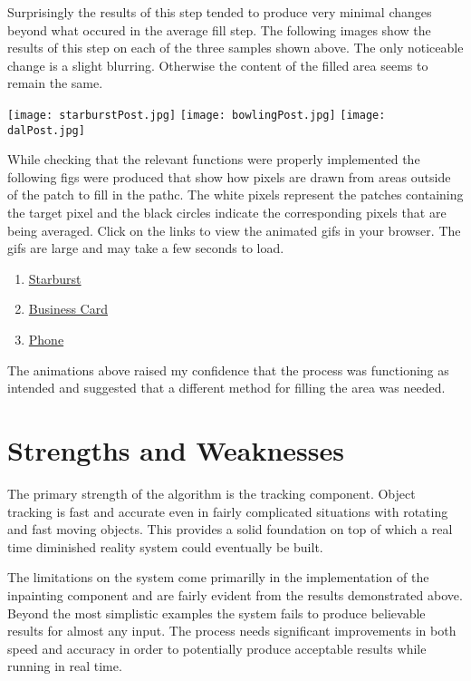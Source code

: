 \documentclass[12pt]{article}
\begin{document}
Surprisingly the results of this step tended to produce very minimal changes beyond what occured in the average fill step. The following images show the results of this step on each of the three samples shown above. The only noticeable change is a slight blurring. Otherwise the content of the filled area seems to remain the same.
\begin{center}
    \texttt{[image: starburstPost.jpg]}
    \texttt{[image: bowlingPost.jpg]}
    \texttt{[image: dalPost.jpg]}
\end{center}

While checking that the relevant functions were properly implemented the following figs were produced that show how pixels are drawn from areas outside of the patch to fill in the pathc. The white pixels represent the patches containing the target pixel and the black circles indicate the corresponding pixels that are being averaged. Click on the links to view the animated gifs in your browser. The gifs are large and may take a few seconds to load.

\begin{enumerate}
    \item \href{http://i.imgur.com/97LCKBh.webm}{Starburst}
    \item \href{https://www.dropbox.com/s/5rqp2byfzef4rhh/card.gif?dl=0}{Business Card}
    \item \href{https://www.dropbox.com/s/72h1hadv85pqgy1/dal.gif?dl=0}{Phone}
\end{enumerate}

The animations above raised my confidence that the process was functioning as intended and suggested that a different method for filling the area was needed. 

\section{Strengths and Weaknesses}
The primary strength of the algorithm is the tracking component. Object tracking is fast and accurate even in fairly complicated situations with rotating and fast moving objects. This provides a solid foundation on top of which a real time diminished reality system could eventually be built. 

The limitations on the system come primarilly in the implementation of the inpainting component and are fairly evident from the results demonstrated above. Beyond the most simplistic examples the system fails to produce believable results for almost any input. The process needs significant improvements in both speed and accuracy in order to potentially produce acceptable results while running in real time.
\end{document}
